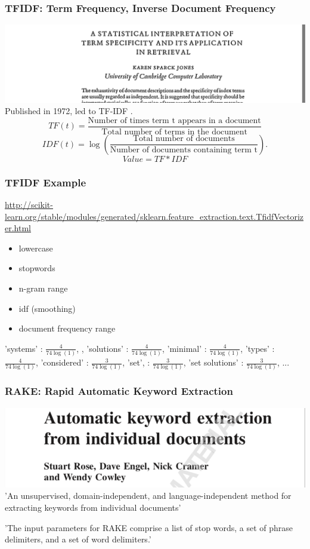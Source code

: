 \documentclass{beamer}
\begin{document}
\begin{frame}
\frametitle{TFIDF: Term Frequency, Inverse Document Frequency}
\includegraphics[width= \textwidth]{img/tfidf}
\vspace{0.5cm}
Published in 1972, led to TF-IDF .
\vspace{0.5cm}
\[
TF(t) = \frac{\text{Number of times term t appears in a document}}{\text{Total number of terms in the document}}
\]
\[
IDF(t) = \log \left( \frac{\text{Total number of documents}}{{\text{Number of documents containing term t}}} \right).
\]
\[
Value = TF * IDF
\]
\end{frame}

\begin{frame}
\frametitle{TFIDF Example}
\url{http://scikit-learn.org/stable/modules/generated/sklearn.feature_extraction.text.TfidfVectorizer.html}

\vspace{0.1in}
\begin{itemize}
\item lowercase
\item stopwords
\item n-gram range 
\item idf (smoothing)
\item document frequency range
\end{itemize}

'systems' : $\frac{4}{74\log (1)}$, , 'solutions' : $\frac{4}{74\log (1)}$, 'minimal' : $\frac{4}{74\log (1)}$, 'types' : $\frac{4}{74\log (1)}$, 'considered' : $\frac{3}{74\log (1)}$, 'set', : $\frac{3}{74\log (1)}$, 'set solutions' : $\frac{3}{74\log (1)}$, ...

\end{frame}

\begin{frame}
\frametitle{RAKE: Rapid Automatic Keyword Extraction}
\includegraphics[width= \textwidth]{img/RAKE}
\vspace{1cm}
'An unsupervised, domain-independent, and language-independent method for extracting keywords from individual documents'
\vspace{0.5cm}

'The input parameters for RAKE comprise a list of stop words, a set of phrase delimiters, and a set of word delimiters.'
\end{frame}
\end{document}
